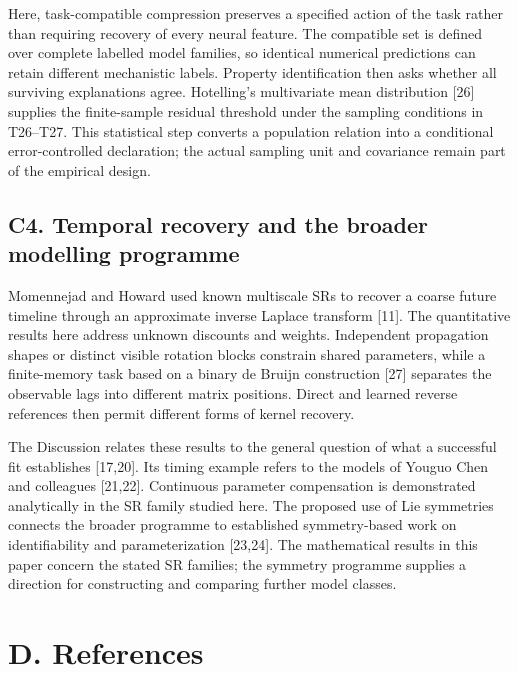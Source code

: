 \documentclass[11pt,a4paper]{article}
\begin{document}
Here, task-compatible compression preserves a specified action of the
task rather than requiring recovery of every neural feature. The
compatible set is defined over complete labelled model families, so
identical numerical predictions can retain different mechanistic labels.
Property identification then asks whether all surviving explanations
agree. Hotelling's multivariate mean distribution {[}26{]} supplies the
finite-sample residual threshold under the sampling conditions in
T26–T27. This statistical step converts a population relation into a
conditional error-controlled declaration; the actual sampling unit and
covariance remain part of the empirical design.

\subsection{C4. Temporal recovery and the broader modelling
programme}\label{c4.-temporal-recovery-and-the-broader-modelling-programme}

Momennejad and Howard used known multiscale SRs to recover a coarse
future timeline through an approximate inverse Laplace transform
{[}11{]}. The quantitative results here address unknown discounts and
weights. Independent propagation shapes or distinct visible rotation
blocks constrain shared parameters, while a finite-memory task based on
a binary de Bruijn construction {[}27{]} separates the observable lags
into different matrix positions. Direct and learned reverse references
then permit different forms of kernel recovery.

The Discussion relates these results to the general question of what a
successful fit establishes {[}17,20{]}. Its timing example refers to the
models of Youguo Chen and colleagues {[}21,22{]}. Continuous parameter
compensation is demonstrated analytically in the SR family studied here.
The proposed use of Lie symmetries connects the broader programme to
established symmetry-based work on identifiability and parameterization
{[}23,24{]}. The mathematical results in this paper concern the stated
SR families; the symmetry programme supplies a direction for
constructing and comparing further model classes.

\clearpage

\section{D. References}\label{d.-references}
\end{document}
